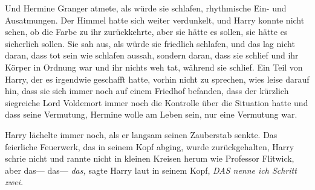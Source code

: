 Und Hermine Granger atmete, als würde sie schlafen, rhythmische Ein- und Ausatmungen. Der Himmel hatte sich weiter verdunkelt, und Harry konnte nicht sehen, ob die Farbe zu ihr zurückkehrte, aber sie hätte es sollen, sie hätte es sicherlich sollen. Sie sah aus, als würde sie friedlich schlafen, und das lag nicht daran, dass tot sein wie schlafen aussah, sondern daran, dass sie schlief und ihr Körper in Ordnung war und ihr nichts weh tat, während sie schlief.
Ein Teil von Harry, der es irgendwie geschafft hatte, vorhin nicht zu sprechen, wies leise darauf hin, dass sie sich immer noch auf einem Friedhof befanden, dass der kürzlich siegreiche Lord Voldemort immer noch die Kontrolle über die Situation hatte und dass seine Vermutung, Hermine wolle am Leben sein, nur eine Vermutung war.

Harry lächelte immer noch, als er langsam seinen Zauberstab senkte. Das feierliche Feuerwerk, das in seinem Kopf abging, wurde zurückgehalten, Harry schrie nicht und rannte nicht in kleinen Kreisen herum wie Professor Flitwick, aber das—
das—
\emph{das,} sagte Harry laut in seinem Kopf, \emph{DAS nenne ich Schritt zwei.}

